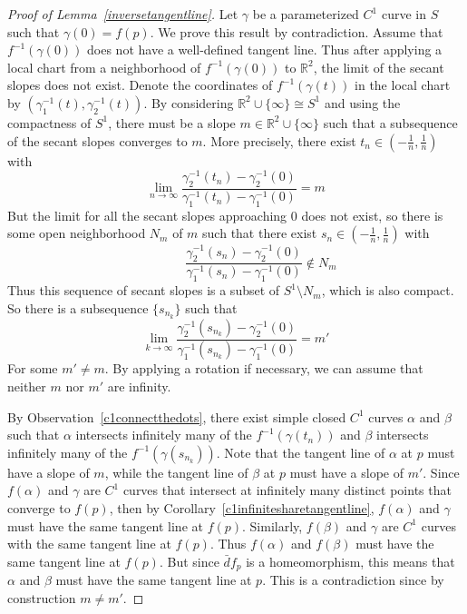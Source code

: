 \documentclass[sn-mathphys-num]{sn-jnl}%
\theoremstyle{thmstyleone}%
\theoremstyle{thmstyletwo}%
\theoremstyle{thmstylethree}%
\begin{document}
\begin{proof}[Proof of Lemma~\ref{inversetangentline}]
Let $\gamma$ be a parameterized $C^1$ curve in $S$ such that $\gamma(0) = f(p)$.  We prove this result by contradiction.  Assume that $f^{-1}(\gamma(0))$ does not have a well-defined tangent line.  Thus after applying a local chart from a neighborhood of $f^{-1}(\gamma(0))$  to $\mathbb{R}^2$,  the limit of the secant slopes does not exist.  Denote the coordinates of $f^{-1}(\gamma(t))$ in the local chart by $(\gamma^{-1}_1(t), \gamma^{-1}_2(t))$.   By considering $\mathbb{R}^2 \cup \{\infty\} \cong S^1$ and using the compactness of  $S^1$,  there must be a slope $m \in \mathbb{R}^2 \cup \{\infty\}$ such that a subsequence of the secant slopes converges to $m$.  More precisely, there exist  $t_{n} \in \left(-\frac 1 n, \frac 1 n \right)$ with
$$\lim_{n \rightarrow \infty} \frac{\gamma^{-1}_2(t_{n}) - \gamma^{-1}_2(0)}{\gamma^{-1}_1(t_{n}) - \gamma^{-1}_1(0)} = m$$
But the limit for all the secant slopes approaching $0$ does not exist, so there is some open neighborhood $N_m$ of $m$ such that there exist $s_n \in \left(-\frac 1 n, \frac 1 n \right)$ with 
$$\qquad \qquad \frac{\gamma^{-1}_2(s_{n}) - \gamma^{-1}_2(0)}{\gamma^{-1}_1(s_{n}) - \gamma^{-1}_1(0)} \notin N_m$$
Thus this sequence of secant slopes is a subset of $S^1 \setminus N_m$, which is also compact.  So there is a subsequence $\{s_{n_k}\}$ such that 
$$\lim_{k\rightarrow \infty}\frac{\gamma^{-1}_2(s_{n_k}) - \gamma^{-1}_2(0)}{\gamma^{-1}_1(s_{n_k}) - \gamma^{-1}_1(0)} = m'$$
For some $m' \neq m$.  By applying a rotation if necessary, we can assume that neither $m$ nor $m'$ are infinity.  

By Observation~\ref{c1connectthedots},  there exist simple closed $C^1$ curves $\alpha$ and $\beta$ such that $\alpha$ intersects infinitely many of the $f^{-1}(\gamma(t_n))$ and $\beta$ intersects infinitely many of the $f^{-1}(\gamma(s_{n_k}))$.  Note that the tangent line of $\alpha$ at $p$ must have a slope of $m$, while the tangent line of $\beta$ at $p$ must have a slope of $m'$.  Since $f(\alpha)$ and $\gamma$ are $C^1$ curves that intersect at infinitely many distinct points that converge to $f(p)$,  then by Corollary~\ref{c1infinitesharetangentline},  $f(\alpha)$ and $\gamma$ must have the same tangent line at $f(p)$. Similarly, $f(\beta)$ and $\gamma$ are $C^1$ curves with the same tangent line at $f(p)$.  Thus $f(\alpha)$ and $f(\beta)$ must have the same tangent line at $f(p)$.  But since $\bar{d}f_p$ is a homeomorphism, this means that $\alpha$ and $\beta$ must have the same tangent line at $p$. This is a contradiction since by construction $m \neq m'$.  
\end{proof}
\end{document}
